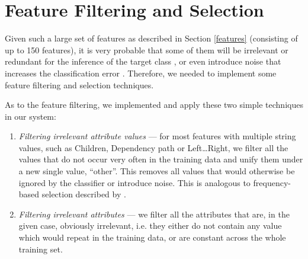 \documentclass[12pt,notitlepage]{report}
\begin{document}
\section{Feature Filtering and Selection}\label{featsel}

Given such a large set of features as described in Section \ref{features} (consisting of up to 150 features), it is very probable that some of them will be irrelevant or redundant for the inference of the target class \citep{john94}, or even introduce noise that increases the classification error \citep[p. 251]{manning08}. Therefore, we needed to implement some feature filtering and selection techniques.

As to the feature filtering, we implemented and apply these two simple techniques in our system:
\begin{enumerate}
    \item \emph{Filtering irrelevant attribute values} --- for most features with multiple string values, such as Children, Dependency path or Left\dots Right, we filter all the values that do not occur very often in the training data and unify them under a new single value, ``other''. This removes all values that would otherwise be ignored by the classifier or introduce noise. This is analogous to frequency-based selection described by \citet[p. 257]{manning08}.
    \item \emph{Filtering irrelevant attributes} --- we filter all the attributes that are, in the given case, obviously irrelevant, i.e. they either do not contain any value which would repeat in the training data, or are constant across the whole training set.
\end{enumerate}
\end{document}

